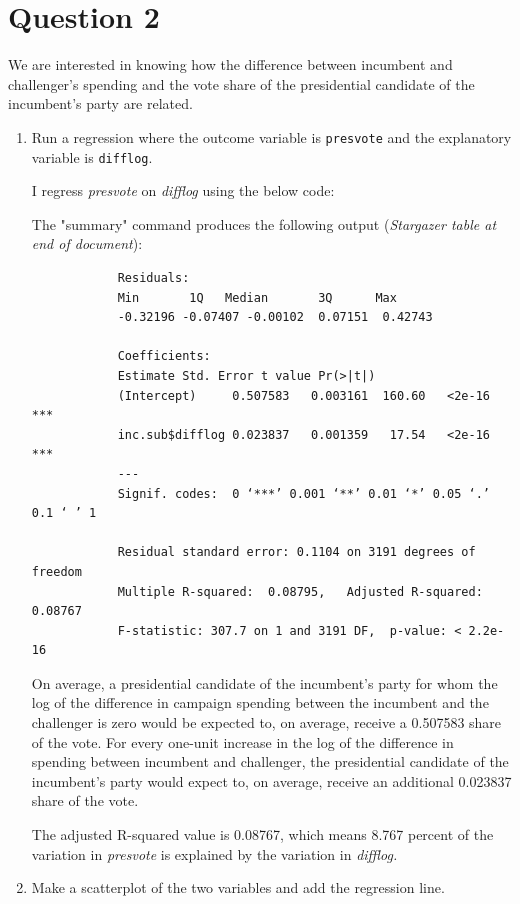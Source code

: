 \documentclass[12pt,letterpaper]{article}
\begin{document}
\section*{Question 2}
\noindent We are interested in knowing how the difference between incumbent and challenger's spending and the vote share of the presidential candidate of the incumbent's party are related.	\vspace{.25cm}
	\begin{enumerate}
		\item Run a regression where the outcome variable is \texttt{presvote} and the explanatory variable is \texttt{difflog}.	\vspace{0.5cm}
		
		I regress \textit{presvote} on \textit{difflog} using the below code:
		
		
		The "summary" command produces the following output (\textit{Stargazer table at end of document}):
		\begin{verbatim}
			Residuals:
			Min       1Q   Median       3Q      Max 
			-0.32196 -0.07407 -0.00102  0.07151  0.42743 
			
			Coefficients:
			Estimate Std. Error t value Pr(>|t|)    
			(Intercept)     0.507583   0.003161  160.60   <2e-16 ***
			inc.sub$difflog 0.023837   0.001359   17.54   <2e-16 ***
			---
			Signif. codes:  0 ‘***’ 0.001 ‘**’ 0.01 ‘*’ 0.05 ‘.’ 0.1 ‘ ’ 1
			
			Residual standard error: 0.1104 on 3191 degrees of freedom
			Multiple R-squared:  0.08795,	Adjusted R-squared:  0.08767 
			F-statistic: 307.7 on 1 and 3191 DF,  p-value: < 2.2e-16 
		\end{verbatim}
		
		On average, a presidential candidate of the incumbent's party for whom the log of the difference in campaign spending between the incumbent and the challenger is zero would be expected to, on average, receive a 0.507583 share of the vote. For every one-unit increase in the log of the difference in spending between incumbent and challenger, the presidential candidate of the incumbent's party would expect to, on average, receive an additional 0.023837 share of the vote.
		
		The adjusted R-squared value is 0.08767, which means 8.767 percent of the variation in \textit{presvote} is explained by the variation in \textit{difflog.}
		
		\item Make a scatterplot of the two variables and add the regression line. 	\vspace{.5cm}
		

\end{enumerate}
\end{document}
